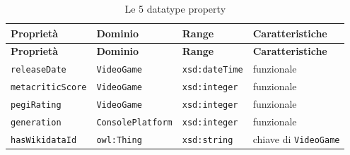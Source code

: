 \begingroup\footnotesize\begin{longtable}{lllp{6cm}}
\caption{Le 5 datatype property}\\ \toprule
\textbf{Proprietà} & \textbf{Dominio} & \textbf{Range} & \textbf{Caratteristiche} \\ \midrule \endfirsthead
\textbf{Proprietà} & \textbf{Dominio} & \textbf{Range} & \textbf{Caratteristiche} \\ \midrule \endhead \bottomrule \endfoot
\texttt{releaseDate} & \texttt{VideoGame} & \texttt{xsd:dateTime} & funzionale \\
\texttt{metacriticScore} & \texttt{VideoGame} & \texttt{xsd:integer} & funzionale \\
\texttt{pegiRating} & \texttt{VideoGame} & \texttt{xsd:integer} & funzionale \\
\texttt{generation} & \texttt{ConsolePlatform} & \texttt{xsd:integer} & funzionale \\
\texttt{hasWikidataId} & \texttt{owl:Thing} & \texttt{xsd:string} & chiave di \texttt{VideoGame} \\
\end{longtable}\endgroup

